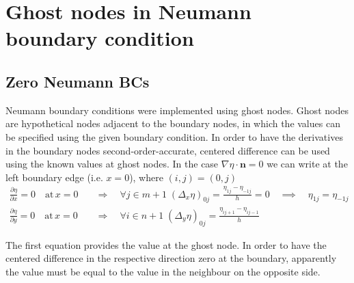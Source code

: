\section{Ghost nodes in Neumann boundary condition}

\subsection{Zero Neumann BCs}
Neumann boundary conditions were implemented using ghost nodes. Ghost nodes are hypothetical nodes adjacent to the boundary nodes, in which the values can be specified using the given boundary condition. In order to have the derivatives in the boundary nodes second-order-accurate, centered difference can be used using the known values at ghost nodes. In the case $\nabla\eta\cdot\bm{n}=0$ we can write at the left boundary edge (i.e. $x=0$), where $(i,j)=(0,j)$
\begin{equation} \label{eq_neumanBC_ghost_pts_value}
	\begin{split}
		\frac{\partial \eta}{\partial x}=0 \quad \mathrm{at}\,x=0 \quad &\Rightarrow\quad \forall j\in m+1 \; (\Delta_x\eta)_{0j} = \frac{\eta_{1j}-\eta_{-1j}}{h} = 0 \quad \implies\quad \eta_{1j}=\eta_{-1j} \\
		\frac{\partial \eta}{\partial y}=0 \quad \mathrm{at}\,x=0 \quad &\Rightarrow\quad \forall i\in n+1 \; (\Delta_y\eta)_{0j}= \frac{\eta_{ij+1}-\eta_{ij-1}}{h}  
	\end{split}
\end{equation}

The first equation provides the value at the ghost node. In order to have the centered difference in the respective direction zero at the boundary, apparently the value must be equal to the value in the neighbour on the opposite side.


